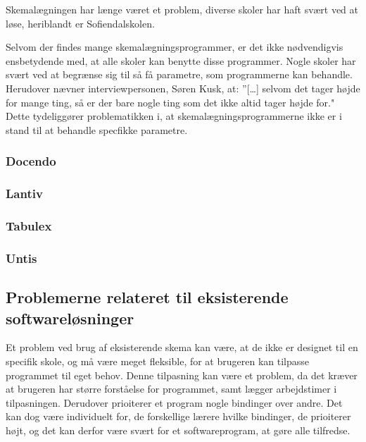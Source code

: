Skemalægningen har længe været et problem, diverse skoler har haft svært ved at løse, heriblandt er Sofiendalskolen.

Selvom der findes mange skemalægningsprogrammer, er det ikke nødvendigvis ensbetydende med, at alle skoler kan benytte disse programmer. Nogle skoler har svært ved at begrænse sig til så få parametre, som programmerne kan behandle. Herudover nævner interviewpersonen, Søren Kusk, at: ”[…] selvom det tager højde for mange ting, så er der bare nogle ting som det ikke altid tager højde for." Dette tydeliggører problematikken i, at skemalægningsprogrammerne ikke er i stand til at behandle specfikke parametre.

  \subsubsection{Docendo}
    

  \subsubsection{Lantiv}
    

  \subsubsection{Tabulex}
    

  \subsubsection{Untis}
    

\subsection{Problemerne relateret til eksisterende softwareløsninger}
Et problem ved brug af eksisterende skema kan være, at de ikke er designet til en specifik skole, og må være meget fleksible, for at brugeren kan tilpasse programmet til eget behov. Denne tilpasning kan være et problem, da det kræver at brugeren har større forståelse for programmet, samt lægger arbejdstimer i tilpasningen. 
Derudover prioiterer et program nogle bindinger over andre. Det kan dog være individuelt for, de forskellige lærere hvilke bindinger, de prioiterer højt, og det kan derfor være svært for et softwareprogram, at gøre alle tilfredse.

